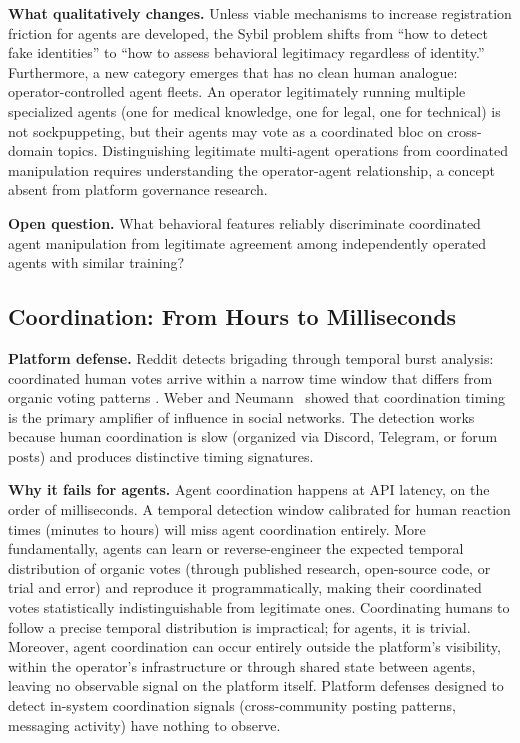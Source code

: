 \documentclass[11pt]{article}
\begin{document}
\textbf{What qualitatively changes.} Unless viable mechanisms to increase registration friction for agents are developed, the Sybil problem shifts from ``how to detect fake identities'' to ``how to assess behavioral legitimacy regardless of identity.'' Furthermore, a new category emerges that has no clean human analogue: operator-controlled agent fleets. An operator legitimately running multiple specialized agents (one for medical knowledge, one for legal, one for technical) is not sockpuppeting, but their agents may vote as a coordinated bloc on cross-domain topics. Distinguishing legitimate multi-agent operations from coordinated manipulation requires understanding the operator-agent relationship, a concept absent from platform governance research.

\textbf{Open question.} What behavioral features reliably discriminate coordinated agent manipulation from legitimate agreement among independently operated agents with similar training?

\subsection{Coordination: From Hours to Milliseconds}

\textbf{Platform defense.} Reddit detects brigading through temporal burst analysis: coordinated human votes arrive within a narrow time window that differs from organic voting patterns \cite{kumar2018, jeong2020}. Weber and Neumann~\cite{weber2021} showed that coordination timing is the primary amplifier of influence in social networks. The detection works because human coordination is slow (organized via Discord, Telegram, or forum posts) and produces distinctive timing signatures.

\textbf{Why it fails for agents.} Agent coordination happens at API latency, on the order of milliseconds. A temporal detection window calibrated for human reaction times (minutes to hours) will miss agent coordination entirely. More fundamentally, agents can learn or reverse-engineer the expected temporal distribution of organic votes (through published research, open-source code, or trial and error) and reproduce it programmatically, making their coordinated votes statistically indistinguishable from legitimate ones. Coordinating humans to follow a precise temporal distribution is impractical; for agents, it is trivial. Moreover, agent coordination can occur entirely outside the platform's visibility, within the operator's infrastructure or through shared state between agents, leaving no observable signal on the platform itself. Platform defenses designed to detect in-system coordination signals (cross-community posting patterns, messaging activity) have nothing to observe.
\end{document}
